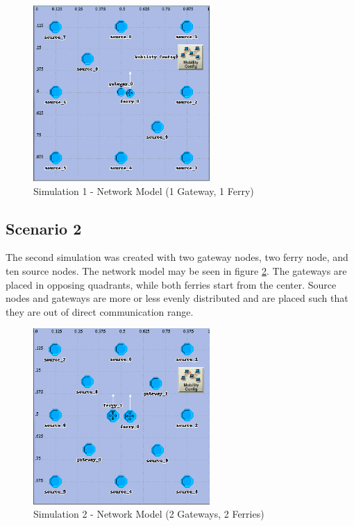 \begin{figure}[ht]
    \centering
    \includegraphics[width=0.6\textwidth]{images/scenario2-top.png}
    \caption{Simulation 1 - Network Model (1 Gateway, 1 Ferry)}
    \label{fig:scenario2}
\end{figure}

\subsection{Scenario 2}		%

The second simulation was created with two gateway nodes, two ferry node, and ten source nodes.
The network model may be seen in figure \ref{fig:scenario3}.
The gateways are placed in opposing quadrants, while both ferries start from the center.
Source nodes and gateways are more or less evenly distributed and are placed such that they are out of direct communication range.

\begin{figure}[ht]
    \centering
    \includegraphics[width=0.6\textwidth]{images/scenario3-top.png}
    \caption{Simulation 2 - Network Model (2 Gateways, 2 Ferries)}
    \label{fig:scenario3}
\end{figure}

